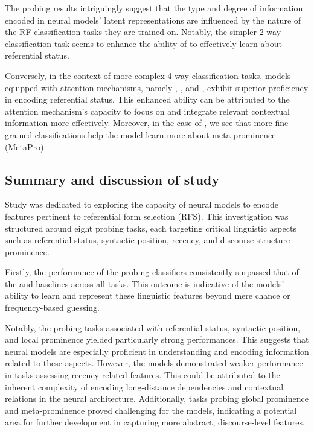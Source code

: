 The probing results intriguingly suggest that the type and degree of information encoded in neural models' latent representations are influenced by the nature of the RF classification tasks they are trained on. Notably, the simpler 2-way classification task seems to enhance the ability of  to effectively learn about referential status. 

Conversely, in the context of more complex 4-way classification tasks, models equipped with attention mechanisms, namely , , and , exhibit superior proficiency in encoding referential status. This enhanced ability can be attributed to the attention mechanism's capacity to focus on and integrate relevant contextual information more effectively. Moreover, in the case of , we see that more fine-grained classifications help the model learn more about meta-prominence (MetaPro).



\subsection{Summary and discussion of study \studG}

Study \studG was dedicated to exploring the capacity of neural models to encode features pertinent to referential form selection (RFS). This investigation was structured around eight probing tasks, each targeting critical linguistic aspects such as referential status, syntactic position, recency, and discourse structure prominence.

Firstly, the performance of the probing classifiers consistently surpassed that of the  and  baselines across all tasks. This outcome is indicative of the models' ability to learn and represent these linguistic features beyond mere chance or frequency-based guessing.

Notably, the probing tasks associated with referential status, syntactic position, and local prominence yielded particularly strong performances. This suggests that neural models are especially proficient in understanding and encoding information related to these aspects. However, the models demonstrated weaker performance in tasks assessing recency-related features. This could be attributed to the inherent complexity of encoding long-distance dependencies and contextual relations in the neural architecture. Additionally, tasks probing global prominence and meta-prominence proved challenging for the models, indicating a potential area for further development in capturing more abstract, discourse-level features.


